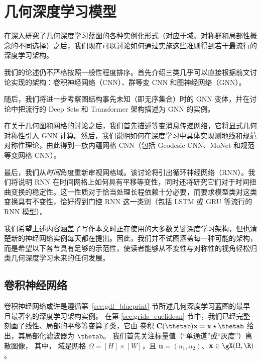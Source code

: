 \section{几何深度学习模型}

在深入研究了几何深度学习蓝图的各种实例化形式（对应于域、对称群和局部性概念的不同选择）之后，我们现在可以讨论如何通过实施这些准则得到若干最流行的深度学习架构。

我们的论述仍不严格按照一般性程度排序。首先介绍三类几乎可以直接根据前文讨论实现的架构：卷积神经网络（CNN）、群等变 CNN 和图神经网络（GNN）。

随后，我们将进一步考察图结构事先未知（即无序集合）时的 GNN 变体，并在讨论中把流行的 Deep Sets 和 Transformer 架构描述为 GNN 的实例。

在关于几何图和网格的讨论之后，我们首先描述等变消息传递网络，它将显式几何对称性引入 GNN 计算。然后，我们说明如何在深度学习中具体实现测地线和规范对称性理论，由此得到一族内蕴网格 CNN（包括 Geodesic CNN、MoNet 和规范等变网格 CNN）。

最后，我们从\emph{时间}角度重新审视网格域。该讨论将引出循环神经网络（RNN）。我们将说明 RNN 在时间网格上如何具有平移等变性，同时还将研究它们对于时间扭曲变换的稳定性。这一性质对于恰当处理长程依赖十分必要，而要求模型类对这类变换具有不变性，恰好得到门控 RNN 这一类别（包括 LSTM 或 GRU 等流行的 RNN 模型）。%

我们希望上述内容涵盖了写作本文时正在使用的大多数关键深度学习架构，但也清楚新的神经网络实例每天都在提出。因此，我们并不试图涵盖每一种可能的架构，而是希望以下各节具有足够的示范性，使读者能够从不变性与对称性的视角轻松归类几何深度学习未来的任何发展。

\subsection{卷积神经网络}
\label{sec:cnnsec}

卷积神经网络或许是遵循第~\ref{sec:gdl_blueprint} 节所述几何深度学习蓝图的最早且最著名的深度学习架构实例。
%
%
%
在第 \ref{sec:grids_euclidean} 节中，我们已经完整刻画了线性、局部的平移等变算子类，它由
卷积 ${\bf C(\thetab)}{\bf x} = {\bf x} \star \thetab$ 给出，其局部化滤波器为 $\thetab$。
我们首先关注标量值（“单通道”或“灰度”）离散图像，
其中，
域是网格 $\Omega = [H] \times [W]$，且 $\mathbf{u} = (u_1, u_2)$、${\bf x} \in \gX(\Omega, \R)$。


